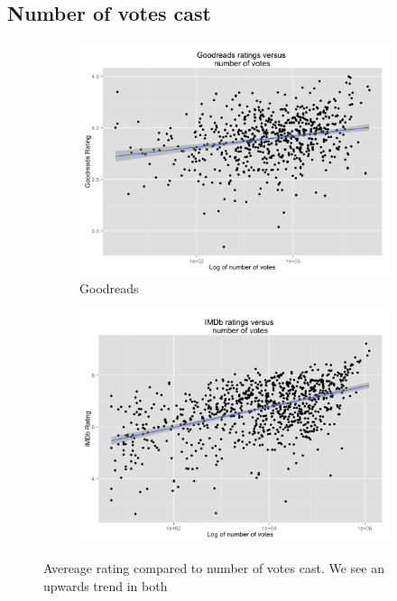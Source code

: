 \documentclass[12pt]{article}
\begin{document}

\subsection{Number of votes cast}

\begin{figure}[!ht]
  \begin{subfigure}[b]{.5\linewidth}
    \centering
    \includegraphics[scale=0.1]{ratingsbooks}
    \caption{Goodreads}
    \label{fig:1a}
  \end{subfigure}%
  \begin{subfigure}[b]{.5\linewidth}
    \centering
    \includegraphics[scale=0.1]{ratingsimdb}
    \label{fig:1b}
  \end{subfigure}
  \caption{Avereage rating compared to number of votes cast. We see an upwards trend in both}
  \label{fig:1}
\end{figure}
\end{document}

